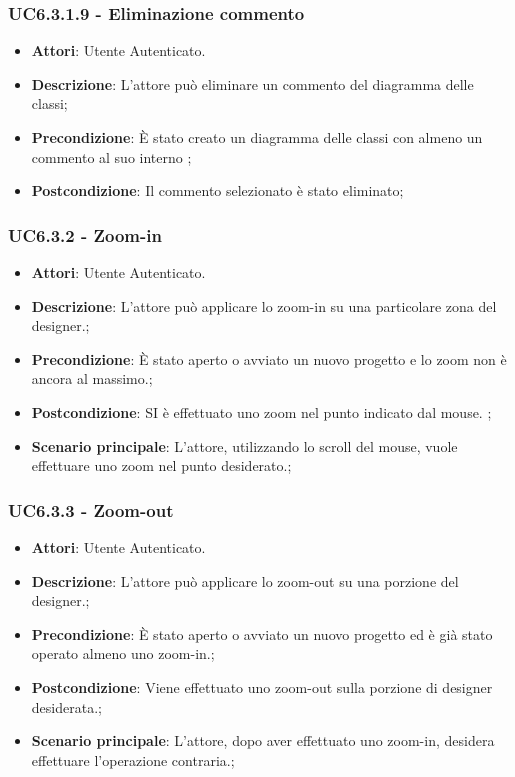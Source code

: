 \subsubsection{UC6.3.1.9 - Eliminazione commento} 
\label{sssec:UC6.3.1.9} 
\begin{itemize} 
\item \textbf{Attori}: Utente Autenticato.
\item \textbf{Descrizione}: L'attore può eliminare un commento del diagramma delle classi;
\item \textbf{Precondizione}: È stato creato un diagramma delle classi con almeno un commento al suo interno
;
\item \textbf{Postcondizione}: Il commento selezionato è stato eliminato;
\end{itemize} 
\subsubsection{UC6.3.2 - Zoom-in} 
\label{sssec:UC6.3.2} 
\begin{itemize} 
\item \textbf{Attori}: Utente Autenticato.
\item \textbf{Descrizione}: L'attore può applicare lo zoom-in su una particolare zona del designer.;
\item \textbf{Precondizione}: È stato aperto o avviato un nuovo progetto e lo zoom non è ancora al massimo.;
\item \textbf{Postcondizione}: SI è effettuato uno zoom nel punto indicato dal mouse.
;
\item \textbf{Scenario principale}: L'attore, utilizzando lo scroll del mouse, vuole effettuare uno zoom nel punto desiderato.;\end{itemize} 
\subsubsection{UC6.3.3 - Zoom-out} 
\label{sssec:UC6.3.3} 
\begin{itemize} 
\item \textbf{Attori}: Utente Autenticato.
\item \textbf{Descrizione}: L'attore può applicare lo zoom-out su una porzione del designer.;
\item \textbf{Precondizione}: È stato aperto o avviato un nuovo progetto ed è già stato operato almeno uno zoom-in.;
\item \textbf{Postcondizione}: Viene effettuato uno zoom-out sulla porzione di designer desiderata.;
\item \textbf{Scenario principale}: L'attore, dopo aver effettuato uno zoom-in, desidera effettuare l'operazione contraria.;\end{itemize} 
